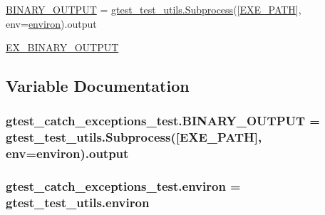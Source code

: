 \begin{DoxyCompactItemize}
\item 
\hyperlink{namespacegtest__catch__exceptions__test_a27d8da05609f357df39614cd41516993}{B\+I\+N\+A\+R\+Y\+\_\+\+O\+U\+T\+P\+UT} = \hyperlink{classgtest__test__utils_1_1_subprocess}{gtest\+\_\+test\+\_\+utils.\+Subprocess}(\mbox{[}\hyperlink{namespacegtest__catch__exceptions__test_a164e7815d55b13a811ce60e2e6f9448d}{E\+X\+E\+\_\+\+P\+A\+TH}\mbox{]}, env=\hyperlink{namespacegtest__catch__exceptions__test_ae51b794c28e667016c180f1b3fc85292}{environ}).output
\item 
\hyperlink{namespacegtest__catch__exceptions__test_a012f2b0e05fd56aa6817595da940c891}{E\+X\+\_\+\+B\+I\+N\+A\+R\+Y\+\_\+\+O\+U\+T\+P\+UT}
\end{DoxyCompactItemize}


\subsection{Variable Documentation}
\subsubsection[{\texorpdfstring{B\+I\+N\+A\+R\+Y\+\_\+\+O\+U\+T\+P\+UT}{BINARY_OUTPUT}}]{\setlength{\rightskip}{0pt plus 5cm}gtest\+\_\+catch\+\_\+exceptions\+\_\+test.\+B\+I\+N\+A\+R\+Y\+\_\+\+O\+U\+T\+P\+UT = {\bf gtest\+\_\+test\+\_\+utils.\+Subprocess}(\mbox{[}{\bf E\+X\+E\+\_\+\+P\+A\+TH}\mbox{]}, env={\bf environ}).output}\hypertarget{namespacegtest__catch__exceptions__test_a27d8da05609f357df39614cd41516993}{}\label{namespacegtest__catch__exceptions__test_a27d8da05609f357df39614cd41516993}
\subsubsection[{\texorpdfstring{environ}{environ}}]{\setlength{\rightskip}{0pt plus 5cm}gtest\+\_\+catch\+\_\+exceptions\+\_\+test.\+environ = gtest\+\_\+test\+\_\+utils.\+environ}\hypertarget{namespacegtest__catch__exceptions__test_ae51b794c28e667016c180f1b3fc85292}{}\label{namespacegtest__catch__exceptions__test_ae51b794c28e667016c180f1b3fc85292}
